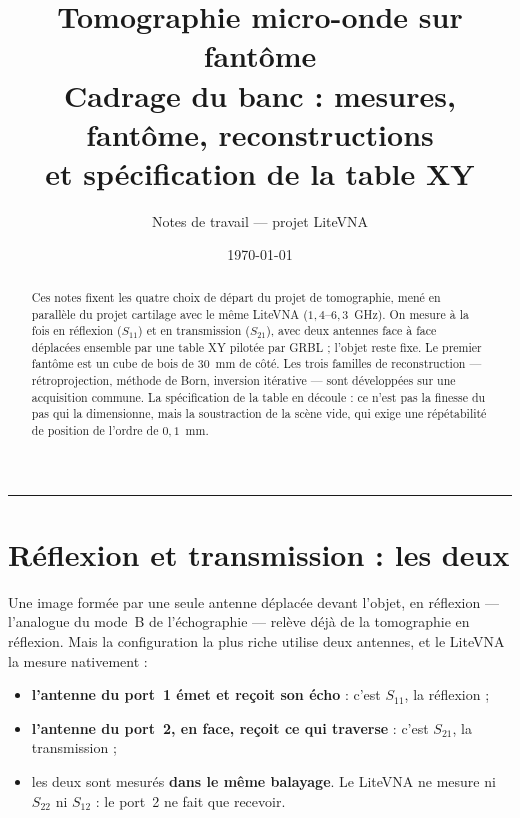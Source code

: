 \documentclass[11pt,a4paper]{article}
\title{\bfseries Tomographie micro-onde sur fantôme\\[2mm]
       \large Cadrage du banc : mesures, fantôme, reconstructions\\
       et spécification de la table XY}
\author{Notes de travail --- projet LiteVNA}
\date{\today}
\begin{document}
\maketitle

\begin{abstract}
\noindent
Ces notes fixent les quatre choix de départ du projet de tomographie, mené en
parallèle du projet cartilage avec le même LiteVNA ($1{,}4$--$6{,}3$~GHz). On
mesure à la fois en réflexion ($S_{11}$) et en transmission ($S_{21}$), avec deux
antennes face à face déplacées ensemble par une table XY pilotée par GRBL ;
l'objet reste fixe. Le premier fantôme est un cube de bois de $30$~mm de côté.
Les trois familles de reconstruction --- rétroprojection, méthode de Born,
inversion itérative --- sont développées sur une acquisition commune. La
spécification de la table en découle : ce n'est pas la finesse du pas qui la
dimensionne, mais la soustraction de la scène vide, qui exige une répétabilité
de position de l'ordre de $0{,}1$~mm.
\end{abstract}

\tableofcontents
\bigskip\hrule\bigskip

\section{Réflexion et transmission : les deux}
\label{sec:mesures}

Une image formée par une seule antenne déplacée devant l'objet, en réflexion ---
l'analogue du mode~B de l'échographie --- relève déjà de la tomographie en
réflexion. Mais la configuration la plus riche utilise deux antennes, et le
LiteVNA la mesure nativement :

\begin{itemize}
\item \textbf{l'antenne du port~1 émet et reçoit son écho} : c'est $S_{11}$, la
      réflexion ;
\item \textbf{l'antenne du port~2, en face, reçoit ce qui traverse} : c'est
      $S_{21}$, la transmission ;
\item les deux sont mesurés \textbf{dans le même balayage}. Le LiteVNA ne mesure
      ni $S_{22}$ ni $S_{12}$ : le port~2 ne fait que recevoir.
\end{itemize}
\end{document}
